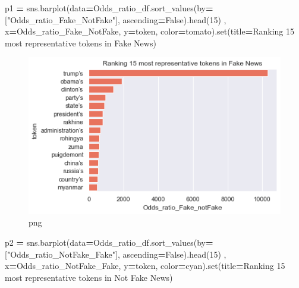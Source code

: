 \documentclass[
  11pt,
  a4paper,
]{article}
\newenvironment{Shaded}{\begin{snugshade}}{\end{snugshade}}
\newcommand{\BuiltInTok}[1]{#1}
\newcommand{\DecValTok}[1]{\textcolor[rgb]{0.00,0.00,0.81}{#1}}
\newcommand{\NormalTok}[1]{#1}
\newcommand{\OperatorTok}[1]{\textcolor[rgb]{0.81,0.36,0.00}{\textbf{#1}}}
\newcommand{\StringTok}[1]{\textcolor[rgb]{0.31,0.60,0.02}{#1}}
\newcommand{\VariableTok}[1]{\textcolor[rgb]{0.00,0.00,0.00}{#1}}
\begin{document}
\begin{Shaded}
\begin{Highlighting}[]

\NormalTok{p1 }\OperatorTok{=}\NormalTok{ sns.barplot(data}\OperatorTok{=}\NormalTok{Odds\_ratio\_df.sort\_values(by}\OperatorTok{=}\NormalTok{[}\StringTok{"Odds\_ratio\_Fake\_NotFake"}\NormalTok{], ascending}\OperatorTok{=}\VariableTok{False}\NormalTok{).head(}\DecValTok{15}\NormalTok{) ,}
\NormalTok{                 x}\OperatorTok{=}\StringTok{\textquotesingle{}Odds\_ratio\_Fake\_NotFake\textquotesingle{}}\NormalTok{, y}\OperatorTok{=}\StringTok{\textquotesingle{}token\textquotesingle{}}\NormalTok{, color}\OperatorTok{=}\StringTok{\textquotesingle{}tomato\textquotesingle{}}\NormalTok{).}\BuiltInTok{set}\NormalTok{(title}\OperatorTok{=}\StringTok{\textquotesingle{}Ranking 15 most representative tokens in Fake News\textquotesingle{}}\NormalTok{) }
\end{Highlighting}
\end{Shaded}

\begin{figure}
\centering
\includegraphics{output_95_0.png}
\caption{png}
\end{figure}

\begin{Shaded}
\begin{Highlighting}[]
\NormalTok{p2 }\OperatorTok{=}\NormalTok{ sns.barplot(data}\OperatorTok{=}\NormalTok{Odds\_ratio\_df.sort\_values(by}\OperatorTok{=}\NormalTok{[}\StringTok{"Odds\_ratio\_NotFake\_Fake"}\NormalTok{], ascending}\OperatorTok{=}\VariableTok{False}\NormalTok{).head(}\DecValTok{15}\NormalTok{) ,}
\NormalTok{                 x}\OperatorTok{=}\StringTok{\textquotesingle{}Odds\_ratio\_NotFake\_Fake\textquotesingle{}}\NormalTok{, y}\OperatorTok{=}\StringTok{\textquotesingle{}token\textquotesingle{}}\NormalTok{, color}\OperatorTok{=}\StringTok{\textquotesingle{}cyan\textquotesingle{}}\NormalTok{).}\BuiltInTok{set}\NormalTok{(title}\OperatorTok{=}\StringTok{\textquotesingle{}Ranking 15 most representative tokens in Not Fake News\textquotesingle{}}\NormalTok{) }
\end{Highlighting}
\end{Shaded}
\end{document}
